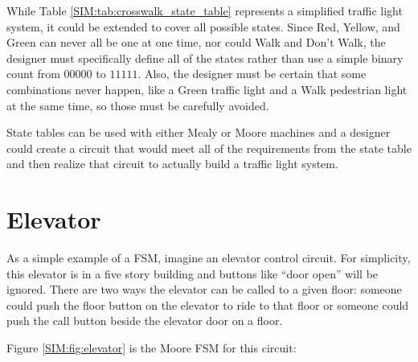 While Table \ref{SIM:tab:crosswalk_state_table} represents a simplified traffic light system, it could be extended to cover all possible states. Since Red, Yellow, and Green can never all be one at one time, nor could Walk and Don't Walk, the designer must specifically define all of the states rather than use a simple binary count from $ 00000 $ to $ 11111 $. Also, the designer must be certain that some combinations never happen, like a Green traffic light and a Walk pedestrian light at the same time, so those must be carefully avoided. 

State tables can be used with either Mealy or Moore machines and a designer could create a circuit that would meet all of the requirements from the state table and then realize that circuit to actually build a traffic light system. 

\section{Elevator}
\label{SIM:sec:elevator}

As a simple example of a \ac{FSM}, imagine an elevator control circuit. For simplicity, this elevator is in a five story building and buttons like ``door open'' will be ignored. There are two ways the elevator can be called to a given floor: someone could push the floor button on the elevator to ride to that floor or someone could push the call button beside the elevator door on a floor.

 Figure \ref{SIM:fig:elevator} is the Moore \ac{FSM} for this circuit:


